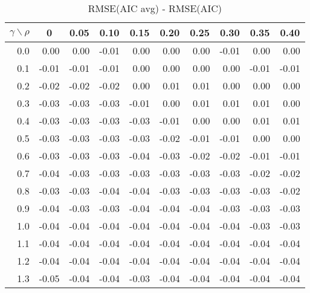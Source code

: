 \documentclass[12pt]{article}
\begin{document}
%
\begin{table}[!tbp]
 \begin{center}
\caption{RMSE(AIC avg) - RMSE(AIC)}
 \begin{tabular}{r|rrrrrrrrr}\hline\hline
\multicolumn{1}{c|}{$\gamma\backslash\rho$}&\multicolumn{1}{c}{0}&\multicolumn{1}{c}{0.05}&\multicolumn{1}{c}{0.10}&\multicolumn{1}{c}{0.15}&\multicolumn{1}{c}{0.20}&\multicolumn{1}{c}{0.25}&\multicolumn{1}{c}{0.30}&\multicolumn{1}{c}{0.35}&\multicolumn{1}{c}{0.40}\tabularnewline
\hline
0.0& 0.00& 0.00&-0.01& 0.00& 0.00& 0.00&-0.01& 0.00& 0.00\tabularnewline
0.1&-0.01&-0.01&-0.01& 0.00& 0.00& 0.00& 0.00&-0.01&-0.01\tabularnewline
0.2&-0.02&-0.02&-0.02& 0.00& 0.01& 0.01& 0.00& 0.00& 0.00\tabularnewline
0.3&-0.03&-0.03&-0.03&-0.01& 0.00& 0.01& 0.01& 0.01& 0.00\tabularnewline
0.4&-0.03&-0.03&-0.03&-0.03&-0.01& 0.00& 0.00& 0.01& 0.01\tabularnewline
0.5&-0.03&-0.03&-0.03&-0.03&-0.02&-0.01&-0.01& 0.00& 0.00\tabularnewline
0.6&-0.03&-0.03&-0.03&-0.04&-0.03&-0.02&-0.02&-0.01&-0.01\tabularnewline
0.7&-0.04&-0.03&-0.03&-0.03&-0.03&-0.03&-0.03&-0.02&-0.02\tabularnewline
0.8&-0.03&-0.03&-0.04&-0.04&-0.03&-0.03&-0.03&-0.03&-0.02\tabularnewline
0.9&-0.04&-0.03&-0.03&-0.04&-0.04&-0.04&-0.03&-0.03&-0.03\tabularnewline
1.0&-0.04&-0.04&-0.04&-0.04&-0.04&-0.04&-0.04&-0.03&-0.03\tabularnewline
1.1&-0.04&-0.04&-0.04&-0.04&-0.04&-0.04&-0.04&-0.04&-0.04\tabularnewline
1.2&-0.04&-0.04&-0.04&-0.04&-0.04&-0.04&-0.04&-0.04&-0.04\tabularnewline
1.3&-0.05&-0.04&-0.04&-0.03&-0.04&-0.04&-0.04&-0.04&-0.04\tabularnewline
\hline
\end{tabular}

\end{center}

\end{table}
\end{document}
